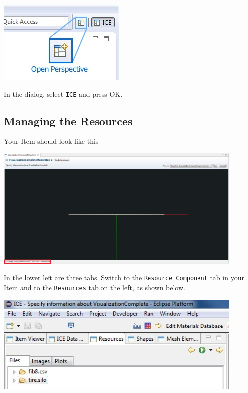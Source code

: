 \documentclass{article}
\begin{document}
\begin{center}
\includegraphics{images/ICE_OpenPerspective}
\end{center}

In the dialog, select \texttt{ICE} and press {OK}.

\subsection{Managing the Resources}

Your Item should look like this.

\begin{center}
\includegraphics[width=12cm]{images/ItemTabs}
\end{center}

In the lower left are three tabs. Switch to the \texttt{Resource Component} tab
in your Item and to the \texttt{Resources} tab on the left, as shown below.

\begin{center}
\includegraphics[width=12cm]{images/ResourcesTab}
\end{center}
\end{document}
